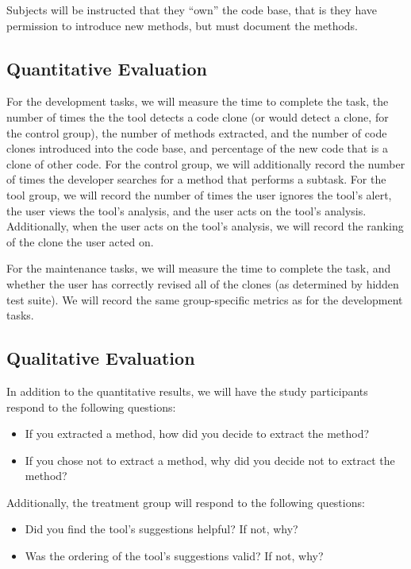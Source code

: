 \documentclass[preprint,10pt]{sigplanconf}
\begin{document}
Subjects will be instructed that they ``own'' the code base, that is they
have permission to introduce new methods, but must document the
methods.  

\subsection{Quantitative Evaluation}
For the development tasks, we will measure the time to complete the
task, the number of times the the tool detects a code clone (or would
detect a clone, for the control group),
the number of methods extracted, and the number of code clones
introduced into the code base, and percentage of the new code that is
a clone of other code. 
For the control group, we will additionally
record the number of times the developer searches for a method that
performs a subtask. 
For the tool group, we will record the number of
times the user ignores the tool's
alert, the user views the tool's analysis, and the user acts on the
tool's analysis. Additionally, when the user acts on the tool's
analysis, we will record the ranking of the clone the user acted on.

For the maintenance tasks, we will measure the time to complete the
task, and whether the user has correctly revised all of the clones (as
determined by hidden test suite). We will record the same
group-specific metrics as for the development tasks.

\subsection{Qualitative Evaluation}
In addition to the quantitative results, we will have the study
participants respond to the following questions:

\begin{itemize}
  \item If you extracted a method, how did you decide to extract the
    method? 
  \item If you chose not to extract a method, why did you decide not
    to extract the method?
\end{itemize}

\noindent Additionally, the treatment group will respond to the following
questions:

\begin{itemize}
  \item Did you find the tool's suggestions helpful? If not, why?
  \item Was the ordering of the tool's suggestions valid? If not, why?
\end{itemize}
\end{document}
